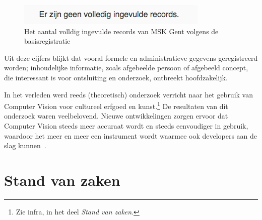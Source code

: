 \documentclass[fleqn,10pt]{voorstel}
\begin{document}
\begin{figure}[h]
	\caption{Het aantal volldig ingevulde records van MSK Gent volgens de basisregistratie}
	\centering
	\includegraphics[width=\linewidth]{pictures/VKC_aantal_basis}
\end{figure}


Uit deze cijfers blijkt dat vooral formele en administratieve gegevens geregistreerd worden; inhoudelijke informatie, zoals afgebeelde persoon of afgebeeld concept, die interessant is voor ontsluiting en onderzoek, ontbreekt hoofdzakelijk.

In het verleden werd reeds (theoretisch) onderzoek verricht naar het gebruik van Computer Vision voor cultureel erfgoed en kunst.\footnote{Zie infra, in het deel \emph{Stand van zaken}.} De resultaten van dit onderzoek waren veelbelovend. Nieuwe ontwikkelingen zorgen ervoor dat Computer Vision steeds meer accuraat wordt en steeds eenvoudiger in gebruik, waardoor het meer en meer een instrument wordt waarmee ook developers aan de slag kunnen~\autocite{Hindle2017}.



\section{Stand van zaken}
\label{sec:state-of-the-art}
\end{document}
